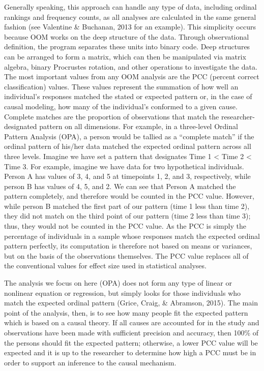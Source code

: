 \documentclass[english,mask,man]{apa6}
\theoremstyle{definition}
\theoremstyle{definition}
\theoremstyle{definition}
\theoremstyle{remark}
\begin{document}
Generally speaking, this approach can handle any type of data, including
ordinal rankings and frequency counts, as all analyses are calculated in
the same general fashion (see Valentine \& Buchanan, 2013 for an
example). This simplicity occurs because OOM works on the deep structure
of the data. Through observational definition, the program separates
these units into binary code. Deep structures can be arranged to form a
matrix, which can then be manipulated via matrix algebra, binary
Procrustes rotation, and other operations to investigate the data. The
most important values from any OOM analysis are the PCC (percent correct
classification) values. These values represent the summation of how well
an individual's responses matched the stated or expected pattern or, in
the case of causal modeling, how many of the individual's conformed to a
given cause. Complete matches are the proportion of observations that
match the researcher-designated pattern on all dimensions. For example,
in a three-level Ordinal Pattern Analysis (OPA), a person would be
tallied as a \enquote{complete match} if the ordinal pattern of his/her
data matched the expected ordinal pattern across all three levels.
Imagine we have set a pattern that designates Time 1 \textless{} Time 2
\textless{} Time 3. For example, imagine we have data for two
hypothetical individuals. Person A has values of 3, 4, and 5 at
timepoints 1, 2, and 3, respectively, while person B has values of 4, 5,
and 2. We can see that Person A matched the pattern completely, and
therefore would be counted in the PCC value. However, while person B
matched the first part of our pattern (time 1 less than time 2), they
did not match on the third point of our pattern (time 2 less than time
3); thus, they would not be counted in the PCC value. As the PCC is
simply the percentage of individuals in a sample whose responses match
the expected ordinal pattern perfectly, its computation is therefore not
based on means or variances, but on the basis of the observations
themselves. The PCC value replaces all of the conventional values for
effect size used in statistical analyses.

The analysis we focus on here (OPA) does not form any type of linear or
nonlinear equation or regression, but simply looks for those individuals
who match the expected ordinal pattern (Grice, Craig, \& Abramson,
2015). The main point of the analysis, then, is to see how many people
fit the expected pattern which is based on a causal theory. If all
causes are accounted for in the study and observations have been made
with sufficient precision and accuracy, then 100\% of the persons should
fit the expected pattern; otherwise, a lower PCC value will be expected
and it is up to the researcher to determine how high a PCC must be in
order to support an inference to the causal mechanism.
\end{document}
